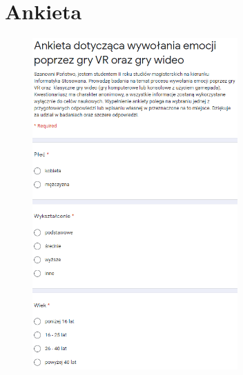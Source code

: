 \chapter*{Ankieta}
\label{chap:dodatek}
\addtocounter{chapter}{0}

\begin{figure}[h]
	\centering
	\includegraphics[width=0.7\textwidth]{images/ankieta1.PNG}
\end{figure}
